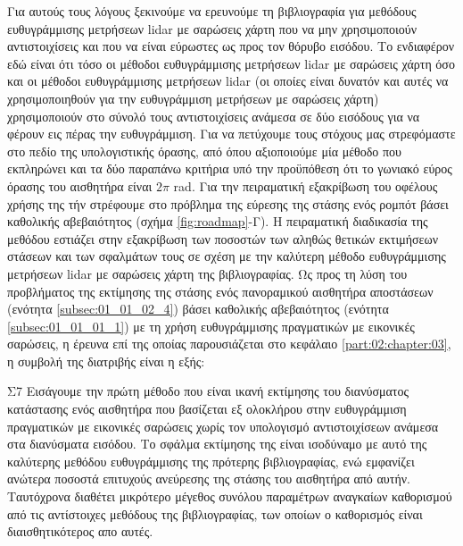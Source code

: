 Για αυτούς τους λόγους ξεκινούμε να ερευνούμε τη βιβλιογραφία για μεθόδους
ευθυγράμμισης μετρήσεων lidar με σαρώσεις χάρτη που να μην χρησιμοποιούν
αντιστοιχίσεις και που να είναι εύρωστες ως προς τον θόρυβο εισόδου. Το
ενδιαφέρον εδώ είναι ότι τόσο οι μέθοδοι ευθυγράμμισης μετρήσεων lidar με
σαρώσεις χάρτη όσο και οι μέθοδοι ευθυγράμμισης μετρήσεων lidar (οι οποίες
είναι δυνατόν και αυτές να χρησιμοποιηθούν για την ευθυγράμμιση μετρήσεων με
σαρώσεις χάρτη) χρησιμοποιούν στο σύνολό τους αντιστοιχίσεις ανάμεσα σε δύο
εισόδους για να φέρουν εις πέρας την ευθυγράμμιση. Για να πετύχουμε τους
στόχους μας στρεφόμαστε στο πεδίο της υπολογιστικής όρασης, από όπου αξιοποιούμε
μία μέθοδο που εκπληρώνει και τα δύο παραπάνω κριτήρια υπό την προϋπόθεση ότι
το γωνιακό εύρος όρασης του αισθητήρα είναι $2\pi$ rad. Για την πειραματική
εξακρίβωση του οφέλους χρήσης της τήν στρέφουμε στο πρόβλημα της εύρεσης της
στάσης ενός ρομπότ βάσει καθολικής αβεβαιότητος (σχήμα \ref{fig:roadmap}-Γ). Η
πειραματική διαδικασία της μεθόδου εστιάζει στην εξακρίβωση των ποσοστών των
αληθώς θετικών εκτιμήσεων στάσεων και των σφαλμάτων τους σε σχέση με την
καλύτερη μέθοδο ευθυγράμμισης μετρήσεων lidar με σαρώσεις χάρτη της
βιβλιογραφίας. Ως προς τη λύση του προβλήματος της εκτίμησης της στάσης ενός
πανοραμικού αισθητήρα αποστάσεων (ενότητα \ref{subsec:01_01_02_4}) βάσει
καθολικής αβεβαιότητος (ενότητα \ref{subsec:01_01_01_1}) με τη χρήση
ευθυγράμμισης πραγματικών με εικονικές σαρώσεις, η έρευνα επί της οποίας
παρουσιάζεται στο κεφάλαιο \ref{part:02:chapter:03}, η συμβολή της διατριβής
είναι η εξής:

\begin{bw_box}
\begin{customcontribution}{Σ7}
  \label{contribution:07}
  Εισάγουμε την πρώτη μέθοδο που είναι ικανή εκτίμησης του διανύσματος
  κατάστασης ενός αισθητήρα που βασίζεται εξ ολοκλήρου στην ευθυγράμμιση
  πραγματικών με εικονικές σαρώσεις χωρίς τον υπολογισμό αντιστοιχίσεων ανάμεσα
  στα διανύσματα εισόδου. Το σφάλμα εκτίμησης της είναι ισοδύναμο με αυτό της
  καλύτερης μεθόδου ευθυγράμμισης της πρότερης βιβλιογραφίας, ενώ εμφανίζει
  ανώτερα ποσοστά επιτυχούς ανεύρεσης της στάσης του αισθητήρα από αυτήν.
  Ταυτόχρονα διαθέτει μικρότερο μέγεθος συνόλου παραμέτρων αναγκαίων καθορισμού
  από τις αντίστοιχες μεθόδους της βιβλιογραφίας, των οποίων ο καθορισμός είναι
  διαισθητικότερος απο αυτές. \cite{Filotheou2022e}
\end{customcontribution}
\end{bw_box}




